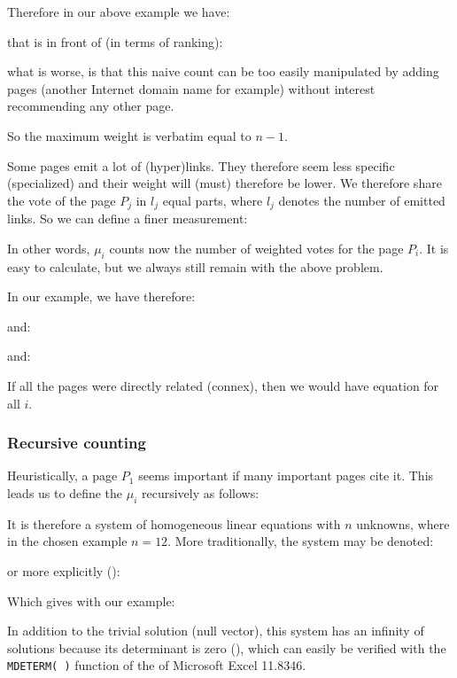 	Therefore in our above example we have:
	
	that is in front of (in terms of ranking):
	
	what is worse, is that this naive count can be too easily manipulated by adding pages (another Internet domain name for example) without interest recommending any other page.
	\begin{tcolorbox}[title=Remark,colframe=black,arc=10pt]
	So the maximum weight is verbatim equal to $n-1$.
	\end{tcolorbox}
	Some pages emit a lot of (hyper)links. They therefore seem less specific (specialized) and their weight will (must) therefore be lower. We therefore share the vote of the page $P_j$ in $l_j$ equal parts, where $l_j$ denotes the number of emitted links. So we can define a finer measurement:
	
	In other words, $\mu_i$ counts now the number of weighted votes for the page $P_i$. It is easy to calculate, but we always still remain with the above problem.
	
	In our example, we have therefore:
	
	and:
	
	and:
	
	\begin{tcolorbox}[title=Remark,colframe=black,arc=10pt]
	If all the pages were directly related (connex), then we would have equation for all $i$.
	\end{tcolorbox}
	
	\subsubsection{Recursive counting}
	Heuristically, a page $P_1$ seems important if many important pages cite it. This leads us to define the $\mu_i$ recursively as follows:
	
	It is therefore a system of homogeneous linear equations with $n$ unknowns, where in the chosen example $n=12$. More traditionally, the system may be denoted:
	
	or more explicitly ():
	\setcounter{MaxMatrixCols}{20}
	
	Which gives with our example:
	\setcounter{MaxMatrixCols}{20}
	
	In addition to the trivial solution (null vector), this system has an infinity of solutions because its determinant is zero (), which can easily be verified with the \texttt{MDETERM( )} function of the of Microsoft Excel 11.8346.


